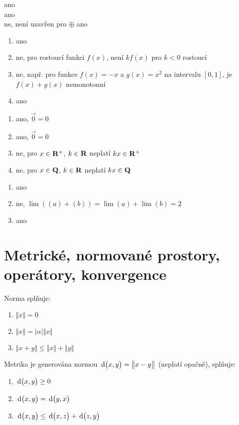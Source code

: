 \documentclass[a4paper,10pt]{book}
\def\Real{{\rm\bf R}}
\def\d{\,{\rm d}}               %
\def\abs#1{\lvert#1\rvert}
\def\norm#1{\bigl\Vert#1\bigr\Vert} %
\def\metr#1#2{\d\bigl(#1,#2\bigr)}          %
\begin{document}
 ano   \\
 ano   \\
 ne, není uzavřen pro $\oplus$ 
 ano   \\
  \begin{enumerate}[label=\alph*), itemsep=-5pt, topsep=-7pt]
    \item ano
    \item ne, pro rostoucí funkci $f(x)$, není $kf(x)$ pro $k<0$ rostoucí
    \item ne, např. pro funkce $f(x)=-x$ a $g(x)=x^2$ na intervalu $[0,1]$, je $f(x)+g(x)$   
          nemonotonní
    \item ano
  \end{enumerate}
  \begin{enumerate}[label=\alph*), itemsep=-5pt, topsep=-7pt]
    \item ano, $\vec{0}=0$
    \item ano, $\vec{0}=0$
    \item ne, pro $x\in\Real^{+}$, $k\in\Real$ neplatí $kx\in\Real^{+}$
    \item ne, pro $x\in\rm\bf{Q}$, $k\in\Real$ neplatí $kx\in\rm\bf{Q}$
  \end{enumerate}
  \begin{enumerate}[label=\alph*), itemsep=-5pt, topsep=-7pt]
    \item ano    
    \item ne, $\lim\left((a)+(b)\right) = \lim (a) + \lim(b) = 2$
    \item ano
  \end{enumerate}



\chapter{Metrické, normované prostory, operátory, konvergence}
Norma splňuje:
\begin{enumerate}[label=N\arabic*, itemsep=-3pt, topsep=-7pt]
\item $\norm{x}=0$ \label{norm1}
\item $\norm{x}=\abs{\alpha}\norm{x}$ \label{norm2}
\item $\norm{x+y}\leq \norm{x} + \norm{y}$ \label{norm3}
\end{enumerate}

Metrika je generována normou $\metr{x}{y} = \norm{x-y}$ (neplatí opačně), splňuje:
\begin{enumerate}[label=M\arabic*, itemsep=-3pt, topsep=-7pt]
\item $\metr{x}{y} \geq 0$
\item $\metr{x}{y} = \metr{y}{x}$
\item $\metr{x}{y}\leq \metr{x}{z} + \metr{z}{y}$
\end{enumerate}
\end{document}
